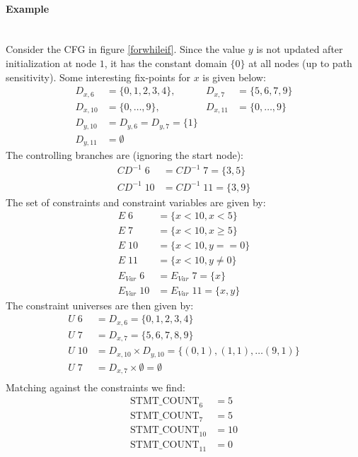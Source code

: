 \documentclass[a4paper]{article}
\newcommand{\NL}[0]{ \hfill\\\noindent }
\begin{document}
\paragraph{Example}\NL
Consider the CFG in figure \ref{forwhileif}. Since the value $y$ is not updated after initialization at node $1$, it has the constant domain $\{0\}$ at all nodes (up to path sensitivity). Some interesting fix-points for $x$ is given below:
\begin{align*}
D_{x,6}  &= \{0,1,2,3,4\},    &D_{x,7}  &= \{5,6,7,9\}\\
D_{x,10} &= \{0, \ldots, 9\}, &D_{x,11} &= \{0, \ldots, 9\} \\
D_{y,10} &= D_{y,6} = D_{y,7} = \{1\}\\
D_{y,11} &= \emptyset 
\end{align*}
\noindent
The controlling branches are (ignoring the start node):
\begin{align*}
CD^{-1}\;6  &= CD^{-1}\;7  = \{3,5\} \\
CD^{-1}\;10 &= CD^{-1}\;11 = \{3, 9\}
\end{align*}
\noindent
The set of constraints and constraint variables are given by:
\begin{align*}
E\;6  &= \{x < 10, x < 5\}\\
E\;7  &= \{x < 10, x \geq 5\}\\
E\;10 &= \{x < 10, y == 0\}\\
E\;11 &= \{x < 10, y \neq 0\}\\
E_{Var}\;6  &= E_{Var}\;7  = \{x\}\\
E_{Var}\;10 &= E_{Var}\;11 = \{x, y\}
\end{align*}
\noindent
The constraint universes are then given by:
\begin{align*}
U\;6  &= D_{x,6} = \{0,1,2,3,4\}\\
U\;7  &= D_{x,7} = \{5,6,7,8,9\}\\
U\;10  &= D_{x,10} \times D_{y,10} = \{(0,1),(1,1), \ldots (9,1)\}\\
U\;7  &= D_{x,7} \times \emptyset = \emptyset\\
\end{align*}
\noindent
Matching against the constraints we find:
\begin{align*}
\text{STMT\_COUNT}_6    &= 5\\
\text{STMT\_COUNT}_7    &= 5\\
\text{STMT\_COUNT}_{10} &= 10\\
\text{STMT\_COUNT}_{11} &= 0
\end{align*}
\end{document}
